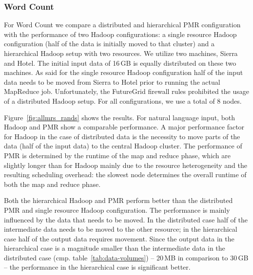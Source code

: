 \documentclass{acm_proc_article-sp}
\begin{document}
\subsubsection*{Word Count}

For Word Count we compare a distributed and hierarchical PMR configuration with
the performance of two Hadoop configurations: a single resource Hadoop
configuration (half of the data is initially moved to that cluster) and a
hierarchical Hadoop setup with two resources. We utilize two machines, Sierra
and Hotel. The initial input data of 16\,GB is equally distributed on these two
machines. As said for the single resource Hadoop configuration half of the input
data needs to be moved from Sierra to Hotel prior to running the actual
MapReduce job. Unfortunately, the FutureGrid firewall rules prohibited the usage
of a distributed Hadoop setup. For all configurations, we use a total of 8
nodes.

Figure~\ref{fig:allmrs_rands} shows the results. For natural language input,
both Hadoop and PMR show a comparable performance. A major performance factor
for Hadoop in the case of distributed data is the necessity to move parts of the
data (half of the input data) to the central Hadoop cluster. The performance of
PMR is determined by the runtime of the map and reduce phase, which are slightly
longer than for Hadoop mainly due to the resource heterogeneity and the
resulting scheduling overhead: the slowest node determines the overall runtime
of both the map and reduce phase.


Both the hierarchical Hadoop and PMR perform better than the
distributed PMR and single resource Hadoop configuration. The performance is
mainly influenced by the data that needs to be moved. In the distributed case
half of the intermediate data needs to be moved to the other resource; in the
hierarchical case half of the output data requires movement. Since the output
data in the hierarchical case is a magnitude smaller than the intermediate data
in the distributed case (cmp. table~\ref{tab:data-volumes}) -- 20\,MB in
comparison to 30\,GB -- the performance in the hierarchical case is
significant better.

\end{document}
